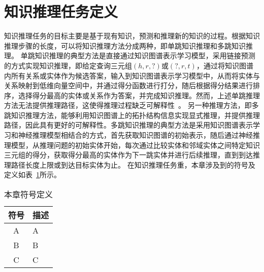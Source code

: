 \documentclass[algorithmlist, AutoFakeBold, AutoFakeSlant, figurelist, tablelist, nomlist, masters]{seuthesix}
\begin{document}
\section{知识推理任务定义}
知识推理任务的目标主要是基于现有知识，预测和推理新的知识的过程。根据知识推理步骤的长度，可以将知识推理方法分成两种，即单跳知识推理和多跳知识推理。
单跳知识推理的典型方法是直接通过知识图谱表示学习模型，采用链接预测的方式实现知识推理，即给定查询三元组$\left(h, r, ?\right)$或$\left(?, r, t\right)$，通过将知识图谱内所有关系或实体作为候选答案，输入到知识图谱表示学习模型中，从而将实体与关系映射到低维向量空间中，并通过得分函数进行打分，随后根据得分结果进行排序，选择得分最高的实体或关系作为答案，并完成知识推理。然而，上述单跳推理方法无法提供推理路径，这使得推理过程缺乏可解释性~\cite{wang2019deeppath}。
另一种推理方法，即多跳知识推理方法，能够利用知识图谱上的拓扑结构信息实现显式推理，并提供推理路径，因此具有更好的可解释性。多跳知识推理的典型方法是采用知识图谱表示学习和神经推理模型相结合的方式，首先获取知识图谱的初始表示，随后通过神经推理模型，从推理问题的初始实体开始，每次通过比较实体和邻域实体之间特定知识三元组的得分，获取得分最高的实体作为下一跳实体并进行后续推理，直到到达推理路径长度上限或到达目标实体为止。
在知识推理任务重，本章涉及到的符号及定义如表~\ref{3_symbols}所示。
\begin{table}
  \centering
  \begin{tabular*}{0.4\textwidth}{@{\extracolsep{\fill}}cl}
		\toprule[1pt]
    符号 & 描述 \\ \hline
    A & A\\
    B & B\\
    C & C\\
		\bottomrule[1pt]
	\end{tabular*}
  \caption{本章符号定义}
  \label{3_symbols}
\end{table}
\end{document}
